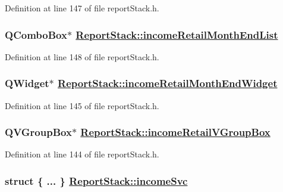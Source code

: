 Definition at line 147 of file report\-Stack.h.\hypertarget{classReportStack_r71}{
\subsubsection[incomeRetailMonthEndList]{\setlength{\rightskip}{0pt plus 5cm}QCombo\-Box$\ast$ \hyperlink{classReportStack_r71}{Report\-Stack::income\-Retail\-Month\-End\-List}}}
\label{classReportStack_r71}


Definition at line 148 of file report\-Stack.h.\hypertarget{classReportStack_r68}{
\subsubsection[incomeRetailMonthEndWidget]{\setlength{\rightskip}{0pt plus 5cm}QWidget$\ast$ \hyperlink{classReportStack_r68}{Report\-Stack::income\-Retail\-Month\-End\-Widget}}}
\label{classReportStack_r68}


Definition at line 145 of file report\-Stack.h.\hypertarget{classReportStack_r67}{
\subsubsection[incomeRetailVGroupBox]{\setlength{\rightskip}{0pt plus 5cm}QVGroup\-Box$\ast$ \hyperlink{classReportStack_r67}{Report\-Stack::income\-Retail\-VGroup\-Box}}}
\label{classReportStack_r67}


Definition at line 144 of file report\-Stack.h.\hypertarget{classReportStack_r105}{
\subsubsection[incomeSvc]{\setlength{\rightskip}{0pt plus 5cm}struct \{ ... \}   \hyperlink{classReportStack_r105}{Report\-Stack::income\-Svc}}}
\label{classReportStack_r105}




